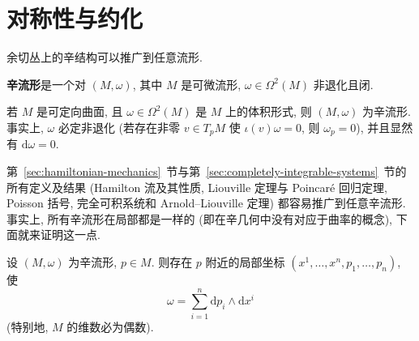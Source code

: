\section{对称性与约化}\label{sec:symmetry-and-reduction}

余切丛上的辛结构可以推广到任意流形.

\begin{RiemannDefinition}\label{def:symplectic-manifold}
\textbf{辛流形}是一个对 $(M,\omega)$, 其中 $M$ 是可微流形, $\omega\in\Omega^2(M)$ 非退化且闭.
\end{RiemannDefinition}

\begin{RiemannExample}\label{ex:orientable-surface-with-volume-form-is-symplectic}
若 $M$ 是可定向曲面, 且 $\omega\in\Omega^2(M)$ 是 $M$ 上的体积形式, 则 $(M,\omega)$ 为辛流形. 事实上, $\omega$ 必定非退化 (若存在非零 $v\in T_pM$ 使 $\iota(v)\omega=0$, 则 $\omega_p=0$), 并且显然有 $\mathrm{d}\omega=0$.
\end{RiemannExample}

第~\ref{sec:hamiltonian-mechanics}~节与第~\ref{sec:completely-integrable-systems}~节的所有定义及结果 (Hamilton 流及其性质, Liouville 定理与 Poincaré 回归定理, Poisson 括号, 完全可积系统和 Arnold–Liouville 定理) 都容易推广到任意辛流形. 事实上, 所有辛流形在局部都是一样的 (即在辛几何中没有对应于曲率的概念), 下面就来证明这一点.

\begin{RiemannTheorem}[Darboux]\label{thm:darboux-for-symplectic-manifolds}
设 $(M,\omega)$ 为辛流形, $p\in M$. 则存在 $p$ 附近的局部坐标 $(x^1,\ldots,x^n,\allowbreak p_1,\ldots,p_n)$, 使
\[
  \omega=\sum_{i=1}^n\mathrm{d}p_i\wedge\mathrm{d}x^i
\]
(特别地, $M$ 的维数必为偶数).
\end{RiemannTheorem}

